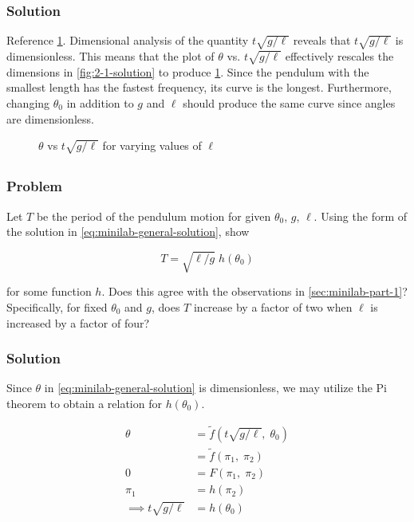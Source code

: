 \documentclass[12pt]{article}
\begin{document}
  \subsubsection*{Solution}
  Reference \cref{fig:2-2-solution}. Dimensional analysis of the quantity
  $t\sqrt{g/\ell}$ reveals that $t\sqrt{g/\ell}$ is dimensionless. This means
  that the plot of $\theta$ vs. $t\sqrt{g/\ell}$ effectively rescales the
  dimensions in \cref{fig:2-1-solution} to produce \cref{fig:2-2-solution}.
  Since the pendulum with the smallest length has the fastest frequency, its
  curve is the longest. Furthermore, changing $\theta_0$ in addition to $g$ and
  $\ell$ should produce the same curve since angles are dimensionless.

  \begin{figure}
    \centering
    \scalebox{0.8}{\huge}
    \caption{$\theta$ vs $t\sqrt{g/\ell}$ for varying values of $\ell$}
    \label{fig:2-2-solution}
  \end{figure}

\subsection{}
  \subsubsection*{Problem}
  Let $T$ be the period of the pendulum motion for given $\theta_0$, $g$, $\ell$.
  Using the form of the solution in \cref{eq:minilab-general-solution}, show

  \begin{equation}
    \label{eq:2-3-prob}
    T=\sqrt{\ell/g}\;h(\theta_0)
  \end{equation}

  for some function $h$. Does this agree with the
  observations in \cref{sec:minilab-part-1}? Specifically, for fixed $\theta_0$
  and $g$, does $T$ increase by a factor of two when $\ell$ is increased by a
  factor of four?

  \subsubsection*{Solution}

  Since $\theta$ in \cref{eq:minilab-general-solution} is dimensionless, we may
  utilize the Pi theorem to obtain a relation for $h(\theta_0)$.

  \begin{equation}
    \begin{aligned}
      \theta &= \tilde{f}(t\sqrt{g/\ell},\;\theta_0) \\
      &= \tilde{f}(\pi_1,\;\pi_2) \\
      0 &= F(\pi_1,\;\pi_2) \\
      \pi_1 &= h(\pi_2) \\
      \implies t\sqrt{g/\ell} &= h(\theta_0) \\
    \end{aligned}
  \end{equation}
\end{document}
